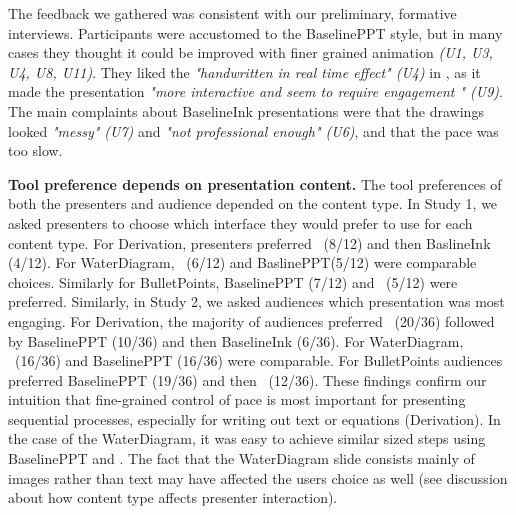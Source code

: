 The feedback we gathered was consistent with our preliminary, formative interviews.  Participants were accustomed to the BaselinePPT style, but in many cases they thought it could be improved with finer grained animation \textit{(U1, U3, U4, U8, U11)}. They liked the \textit{"handwritten in real time effect" (U4)}   in \interface, as it made the presentation \textit{"more interactive and seem to require engagement " (U9)}. The main complaints about BaselineInk presentations were that the drawings looked \textit{"messy" (U7)} and \textit{"not professional enough" (U6)}, and that the pace was too slow.

\textbf{Tool preference depends on presentation content.}
The tool preferences of both the presenters and audience depended on the content type.
%
In Study 1, we asked presenters to choose which interface they would prefer to use for each content type.
%
For Derivation, presenters preferred  \interface\ (8/12) and then BaslineInk (4/12). For WaterDiagram, \interface\ (6/12) and BaslinePPT(5/12) were comparable choices. Similarly for BulletPoints, BaselinePPT (7/12) and \interface\ (5/12) were preferred.
%
Similarly, in Study 2, we asked audiences which presentation was most engaging. For Derivation, the majority of audiences preferred \interface\ (20/36) followed by BaselinePPT (10/36) and then BaselineInk (6/36). For WaterDiagram, \interface\ (16/36) and BaselinePPT (16/36) were comparable. For BulletPoints audiences preferred BaselinePPT (19/36) and then \interface\ (12/36).
%
These findings confirm our intuition that fine-grained control of pace is most important for presenting sequential processes, especially for writing out text or equations (Derivation). In the case of the WaterDiagram, it was easy to achieve similar sized steps using BaselinePPT and \interface. The fact that the WaterDiagram slide consists mainly of images rather than text may have affected the users choice as well (see discussion about how content type affects presenter interaction).  
